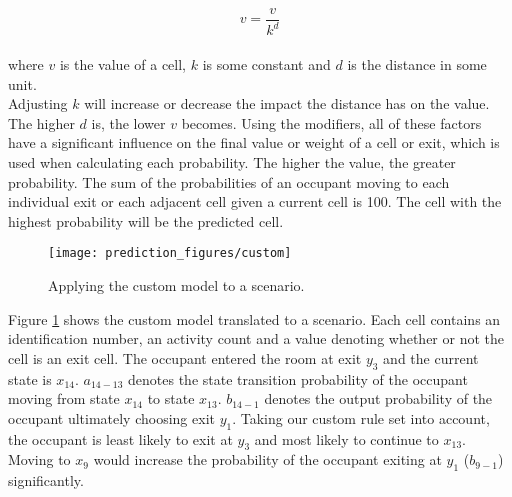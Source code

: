 \begin{equation}
v = \frac{v}{k^d}
\end{equation}
\\
where \(v\) is the value of a cell, \(k\) is some constant and \(d\) is the distance in some unit. \\
Adjusting \(k\) will increase or decrease the impact the distance has on the value. The higher \(d\) is, the lower \(v\) becomes. Using the modifiers, all of these factors have a significant influence on the final value or weight of a cell or exit, which is used when calculating each probability. The higher the value, the greater probability. The sum of the probabilities of an occupant moving to each individual exit or each adjacent cell given a current cell is 100. The cell with the highest probability will be the predicted cell. 
\begin{figure}[ht]
\centering
\texttt{[image: prediction\_figures/custom]}
\caption{Applying the custom model to a scenario.}
\label{fig:custom_model}
\end{figure}

Figure \ref{fig:custom_model} shows the custom model translated to a scenario. Each cell contains an identification number, an activity count and a value denoting whether or not the cell is an exit cell. The occupant entered the room at exit \(y_3\) and the current state is \(x_{14}\). \(a_{14-13}\) denotes the state transition probability of the occupant moving from state \(x_{14}\) to state \(x_{13}\). \(b_{14-1}\) denotes the output probability of the occupant ultimately choosing exit \(y_{1}\). Taking our custom rule set into account, the occupant is least likely to exit at \(y_3\) and most likely to continue to \(x_{13}\). Moving to \(x_9\) would increase the probability of the occupant exiting at \(y_{1}\) (\(b_{9-1}\)) significantly.